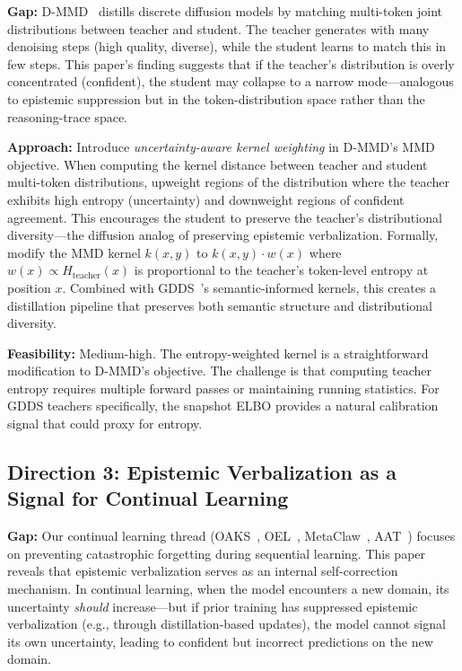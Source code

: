 \documentclass[11pt]{article}
\begin{document}
\textbf{Gap:} D-MMD~\cite{dmmd} distills discrete diffusion models by matching multi-token joint distributions between teacher and student. The teacher generates with many denoising steps (high quality, diverse), while the student learns to match this in few steps. This paper's finding suggests that if the teacher's distribution is overly concentrated (confident), the student may collapse to a narrow mode---analogous to epistemic suppression but in the token-distribution space rather than the reasoning-trace space.

\textbf{Approach:} Introduce \textit{uncertainty-aware kernel weighting} in D-MMD's MMD objective. When computing the kernel distance between teacher and student multi-token distributions, upweight regions of the distribution where the teacher exhibits high entropy (uncertainty) and downweight regions of confident agreement. This encourages the student to preserve the teacher's distributional diversity---the diffusion analog of preserving epistemic verbalization. Formally, modify the MMD kernel $k(x, y)$ to $k(x, y) \cdot w(x)$ where $w(x) \propto H_{\mathrm{teacher}}(x)$ is proportional to the teacher's token-level entropy at position $x$. Combined with GDDS~\cite{gdds}'s semantic-informed kernels, this creates a distillation pipeline that preserves both semantic structure and distributional diversity.

\textbf{Feasibility:} Medium-high. The entropy-weighted kernel is a straightforward modification to D-MMD's objective. The challenge is that computing teacher entropy requires multiple forward passes or maintaining running statistics. For GDDS teachers specifically, the snapshot ELBO provides a natural calibration signal that could proxy for entropy.

\subsection{Direction 3: Epistemic Verbalization as a Signal for Continual Learning}

\textbf{Gap:} Our continual learning thread (OAKS~\cite{oaks}, OEL~\cite{oel}, MetaClaw~\cite{metaclaw}, AAT~\cite{aat}) focuses on preventing catastrophic forgetting during sequential learning. This paper reveals that epistemic verbalization serves as an internal self-correction mechanism. In continual learning, when the model encounters a new domain, its uncertainty \textit{should} increase---but if prior training has suppressed epistemic verbalization (e.g., through distillation-based updates), the model cannot signal its own uncertainty, leading to confident but incorrect predictions on the new domain.
\end{document}
